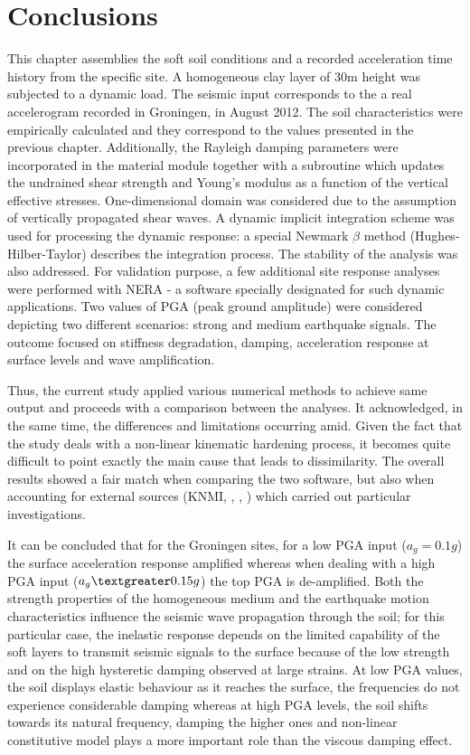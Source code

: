	\newpage
	\section{Conclusions}
	This chapter assemblies the soft soil conditions and a recorded acceleration time history from the specific site. A homogeneous clay layer of 30m height was subjected to a dynamic load. The seismic input corresponds to the a real accelerogram recorded in Groningen, in August 2012. The soil characteristics were empirically calculated and they correspond to the values presented in the previous chapter. Additionally, the Rayleigh damping parameters were incorporated in the material module together with a subroutine which updates the undrained shear strength and Young's modulus as a function of the vertical effective stresses. One-dimensional domain was considered due to the assumption of vertically propagated shear waves. A dynamic implicit integration scheme was used for processing the dynamic response: a special Newmark $\beta$ method (Hughes-Hilber-Taylor) describes the integration process. The stability of the analysis was also addressed. For validation purpose, a few additional site response analyses were performed with NERA - a software specially designated for such dynamic applications. Two values of PGA (peak ground amplitude) were considered depicting two different scenarios: strong and medium earthquake signals. The outcome focused on stiffness degradation, damping, acceleration response at surface levels and wave amplification.
	
	Thus, the current study applied various numerical methods to achieve same output and proceeds with a comparison between the analyses. It acknowledged, in the same time, the differences and limitations occurring amid. Given the fact that the study deals with a non-linear kinematic hardening process, it becomes quite difficult to point exactly the main cause that leads to dissimilarity. The overall results showed a fair match when comparing the two software, but also when accounting for external sources (KNMI, \cite{dost2012monitoring}, \cite{dost2004scaling}, \cite{dost2013august}) which carried out particular investigations. 
	
	It can be concluded that for the Groningen sites, for a low PGA input ($a_g=0.1g$) the surface acceleration response amplified whereas when dealing with a high PGA input ($a_g\textgreater0.15g$) the top PGA is de-amplified. Both the strength properties of the homogeneous medium and the earthquake motion characteristics influence the seismic wave propagation through the soil; for this particular case, the inelastic response depends on the limited capability of the soft layers to transmit seismic signals to the surface because of the low strength and on the high hysteretic damping observed at large strains. At low PGA values, the soil displays elastic behaviour as it reaches the surface, the frequencies do not experience considerable damping whereas at high PGA levels, the soil shifts towards its natural frequency, damping the higher ones and non-linear constitutive model plays a more important role than the viscous damping effect.
